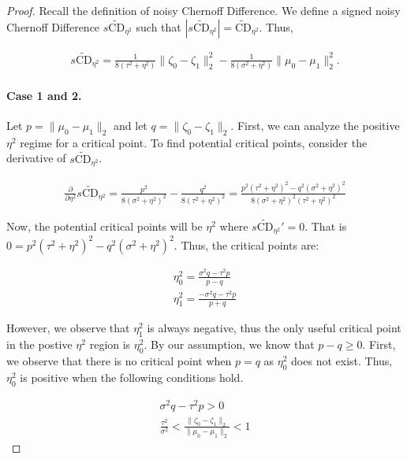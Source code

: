 \documentclass[11pt,letterpaper]{article}
\begin{document}
\begin{proof}

 
 Recall the definition of noisy Chernoff Difference. We define a signed noisy Chernoff Difference $s\widetilde{\text{CD}}_{\eta^2}$ such that $|s\widetilde{\text{CD}}_{\eta^2}| = \widetilde{\text{CD}}_{\eta^2}$. Thus,

\begin{align}
      s \widetilde{\text{CD}}_{\eta^2}=
     \frac{1}{8(\tau^2 + \eta^2)}\|\zeta_0 - \zeta_1\|^2_2 - \frac{1}{8(\sigma^2+\eta^2)}\|\mu_0 - \mu_1\|^2_2.
\end{align}

\paragraph{Case 1 and 2.}Let $p = \|\mu_0 - \mu_1\|_2$ and let $q = \|\zeta_0 - \zeta_1\|_2$. First, we can analyze the positive $\eta^2$ regime for a critical point. To find potential critical points, consider the derivative of $s\widetilde{\text{CD}}_{\eta^2}$.

\begin{align}
    \frac{\partial}{\partial\eta^2} s \widetilde{\text{CD}}_{\eta^2}  = \frac{p^2}{8(\sigma^2 + \eta^2)^2} - \frac{q^2}{8(\tau^2 + \eta^2)^2} = \frac{p^2(\tau^2 + \eta^2)^2-q^2(\sigma^2 + \eta^2)^2}{8(\sigma^2 + \eta^2)^2(\tau^2 + \eta^2)^2}
\end{align}

Now, the potential critical points will be $\eta^2$ where $s\widetilde{\text{CD}}_{\eta^2}' = 0$. That is $0 = p^2(\tau^2 + \eta^2)^2-q^2(\sigma^2 + \eta^2)^2$. Thus, the critical points are:

\begin{align}
    \eta_0^2 = \frac{\sigma^2q-\tau^2p}{p-q} \\\eta_1^2 =\frac{-\sigma^2q-\tau^2p}{p+q}
\end{align}



However, we observe that $\eta_1^2$ is always negative, thus the only useful critical point in the postive $\eta^2$ region is $\eta_0^2$. By our assumption, we know that $p-q \geq 0$. First, we observe that there is no critical point when $p=q$ as $\eta_0^2$ does not exist. Thus, $\eta_0^2$ is positive when the following conditions hold.

\begin{align}
    \sigma^2q-\tau^2p >0 \\
    \frac{\tau^2}{\sigma^2} < \frac{\|\zeta_0 - \zeta_1\|_2}{\|\mu_0 - \mu_1\|_2} < 1
\end{align}


\end{proof}
\end{document}
